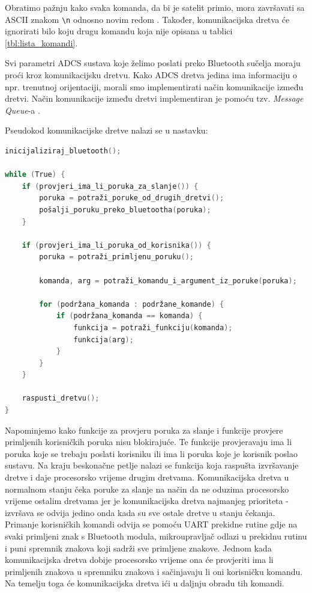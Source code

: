 \documentclass[times, utf8, diplomski, numeric]{templates/template}
\begin{document}
{{{{                Obratimo pažnju kako svaka komanda, da bi je satelit primio, mora završavati sa ASCII znakom \texttt{\textbackslash n} odnosno novim redom . Također, komunikacijska dretva će ignorirati bilo koju drugu komandu koja nije opisana u tablici \ref{tbl:lista_komandi}.

                Svi parametri ADCS sustava koje želimo poslati preko Bluetooth sučelja moraju proći kroz komunikacijsku dretvu. Kako ADCS dretva jedina ima informaciju o npr. trenutnoj orijentaciji, morali smo implementirati način komunikacije između dretvi. Način komunikacije između dretvi implementiran je pomoću tzv. \emph{Message Queue}-a \cite{message_queue}.

                Pseudokod komunikacijske dretve nalazi se u nastavku:

                \begin{lstlisting}[language=C]
inicijaliziraj_bluetooth();

while (True) {
    if (provjeri_ima_li_poruka_za_slanje()) {
        poruka = potraži_poruke_od_drugih_dretvi();
        pošalji_poruku_preko_bluetootha(poruka);
    }

    if (provjeri_ima_li_poruka_od_korisnika()) {
        poruka = potraži_primljenu_poruku();

        komanda, arg = potraži_komandu_i_argument_iz_poruke(poruka);

        for (podržana_komanda : podržane_komande) {
            if (podržana_komanda == komanda) {
                funkcija = potraži_funkciju(komanda);
                funkcija(arg);
            }
        }
    }

    raspusti_dretvu();
}           \end{lstlisting}

                Napominjemo kako funkcije za provjeru poruka za slanje i funkcije provjere primljenih korisničkih poruka nisu blokirajuće. Te funkcije provjeravaju ima li poruka koje se trebaju poslati korisniku ili ima li poruka koje je korisnik poslao sustavu. Na kraju beskonačne petlje nalazi se funkcija koja raspušta izvršavanje dretve i daje procesorsko vrijeme drugim dretvama. Komunikacijska dretva u normalnom stanju čeka poruke za slanje na način da ne oduzima procesorsko vrijeme ostalim dretvama jer je komunikacijska dretva najmanjeg prioriteta - izvršava se odvija jedino onda kada su sve ostale dretve u stanju čekanja. Primanje korisničkih komandi odvija se pomoću UART prekidne rutine gdje na svaki primljeni znak s Bluetooth modula, mikroupravljač odlazi u prekidnu rutinu i puni spremnik znakova koji sadrži sve primljene znakove. Jednom kada komunikacijska dretva dobije procesorsko vrijeme ona će provjeriti ima li primljenih znakova u spremniku znakova i sačinjavaju li oni korisničku komandu. Na temelju toga će komunikacijska dretva ići u daljnju obradu tih komandi. 
            }
        }
    }

}
\end{document}
